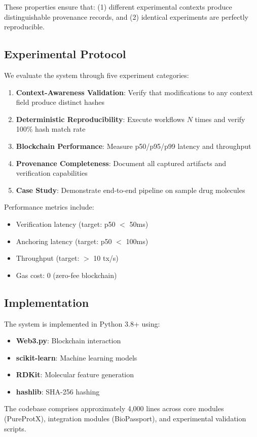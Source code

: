 These properties ensure that: (1) different experimental contexts produce distinguishable provenance records, and (2) identical experiments are perfectly reproducible.

\subsection{Experimental Protocol}

We evaluate the system through five experiment categories:

\begin{enumerate}
    \item \textbf{Context-Awareness Validation}: Verify that modifications to any context field produce distinct hashes
    \item \textbf{Deterministic Reproducibility}: Execute workflows $N$ times and verify 100\% hash match rate
    \item \textbf{Blockchain Performance}: Measure p50/p95/p99 latency and throughput
    \item \textbf{Provenance Completeness}: Document all captured artifacts and verification capabilities
    \item \textbf{Case Study}: Demonstrate end-to-end pipeline on sample drug molecules
\end{enumerate}

Performance metrics include:
\begin{itemize}
    \item Verification latency (target: p50 $<$ 50ms)
    \item Anchoring latency (target: p50 $<$ 100ms)
    \item Throughput (target: $>$ 10 tx/s)
    \item Gas cost: 0 (zero-fee blockchain)
\end{itemize}

\subsection{Implementation}

The system is implemented in Python 3.8+ using:
\begin{itemize}
    \item \textbf{Web3.py}: Blockchain interaction
    \item \textbf{scikit-learn}: Machine learning models
    \item \textbf{RDKit}: Molecular feature generation
    \item \textbf{hashlib}: SHA-256 hashing
\end{itemize}

The codebase comprises approximately 4,000 lines across core modules (PureProtX), integration modules (BioPassport), and experimental validation scripts.

